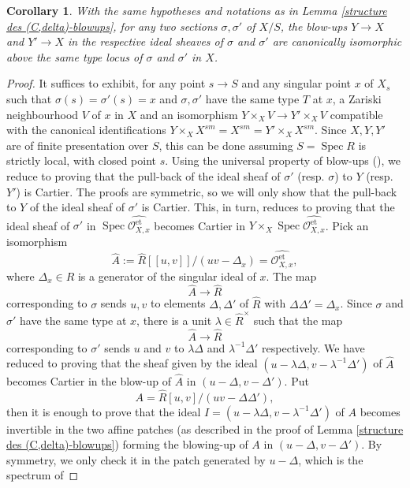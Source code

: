 \documentclass[a4paper,10pt,twoside]{article}
\newcommand{\on}[1]{\operatorname{#1}}
\renewcommand{\O}{\mathcal{O}}
\DeclareMathOperator{\spec}{Spec}
\newtheorem{cor}[thm]{Corollary}
\theoremstyle{definition}
\theoremstyle{remark}
\renewcommand{\on}[1]{\operatorname{#1}}
\begin{document}
\begin{cor}\label{corollary:unicite_zariski_locale_des_T-refinements}
With the same hypotheses and notations as in Lemma \ref{structure des (C,delta)-blowups}, for any two sections $\sigma,\sigma'$ of $X/S$, the blow-ups $Y\to X$ and $Y'\to X$ in the respective ideal sheaves of $\sigma$ and $\sigma'$ are canonically isomorphic above the same type locus of $\sigma$ and $\sigma'$ in $X$.
\end{cor}

\begin{proof}
It suffices to exhibit, for any point $s\to S$ and any singular point $x$ of $X_s$ such that $\sigma(s)=\sigma'(s)=x$ and $\sigma,\sigma'$ have the same type $T$ at $x$, a Zariski neighbourhood $V$ of $x$ in $X$ and an isomorphism $Y\times_X V \to Y'\times_X V$ compatible with the canonical identifications $Y\times_X X^{sm}=X^{sm}=Y'\times_X X^{sm}$. Since $X,Y,Y'$ are of finite presentation over $S$, this can be done assuming $S=\spec R$ is strictly local, with closed point $s$. Using the universal property of blow-ups (\cite[\href{https://stacks.math.columbia.edu/tag/0806}{Tag 0806}]{stacks-project}), we reduce to proving that the pull-back of the ideal sheaf of $\sigma'$ (resp. $\sigma$) to $Y$ (resp. $Y'$) is Cartier. The proofs are symmetric, so we will only show that the pull-back to $Y$ of the ideal sheaf of $\sigma'$ is Cartier. This, in turn, reduces to proving that the ideal sheaf of $\sigma'$ in $\spec\widehat{\O_{X,x}^{\on{et}}}$ becomes Cartier in $Y\times_X \spec\widehat{\O_{X,x}^{\on{et}}}$. Pick an isomorphism
\[
\widehat{A}:=\widehat{R}[[u,v]]/(uv-\Delta_x)=\widehat{\O_{X,x}^{\on{et}}},
\]
where $\Delta_x\in R$ is a generator of the singular ideal of $x$. The map
\[
\widehat A \to \widehat{R}
\]
corresponding to $\sigma$ sends $u,v$ to elements $\Delta,\Delta'$ of $\widehat{R}$ with $\Delta\Delta'=\Delta_x$. Since $\sigma$ and $\sigma'$ have the same type at $x$, there is a unit $\lambda\in\widehat{R}^\times$ such that the map
\[
\widehat A \to \widehat{R}
\]
corresponding to $\sigma'$ sends $u$ and $v$ to $\lambda\Delta$ and $\lambda^{-1}\Delta'$ respectively. We have reduced to proving that the sheaf given by the ideal $(u-\lambda\Delta, v-\lambda^{-1}\Delta')$ of $\widehat A$ becomes Cartier in the blow-up of $\widehat{A}$ in $(u-\Delta,v-\Delta')$. Put
\[
A=\widehat{R}[u,v]/(uv-\Delta\Delta'),
\]
then it is enough to prove that the ideal $I=(u-\lambda\Delta, v-\lambda^{-1}\Delta')$ of $A$ becomes invertible in the two affine patches (as described in the proof of Lemma \ref{structure des (C,delta)-blowups}) forming the blowing-up of $A$ in $(u-\Delta,v-\Delta')$. By symmetry, we only check it in the patch generated by $u-\Delta$, which is the spectrum of

\end{proof}
\end{document}
